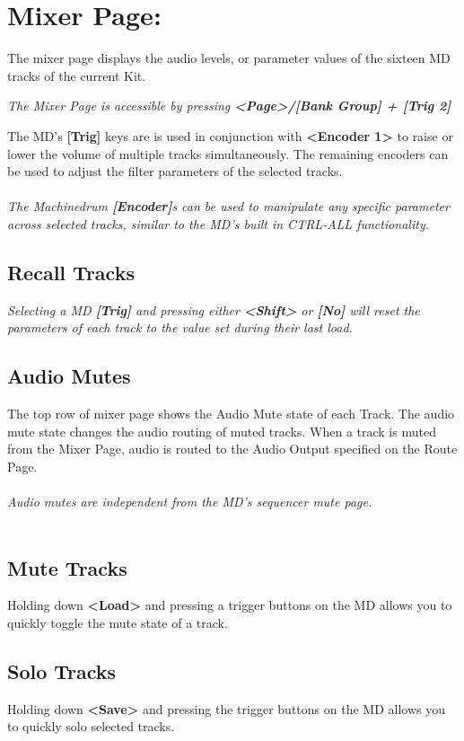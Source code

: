 \chapter{Mixer Page:}
The mixer page displays the audio levels, or parameter values of the sixteen MD tracks of the current Kit.

\textit{The Mixer Page is accessible by pressing \textbf{<Page>/[Bank Group] + [Trig 2]}}


The MD's \textbf{[Trig]} keys are is used in conjunction with \textbf{<Encoder 1>} to raise or lower the volume of multiple tracks simultaneously. The remaining encoders can be used to adjust the filter parameters of the selected tracks.\\\\
\textit{The Machinedrum \textbf{[Encoder]}s can be used to manipulate any specific parameter across selected tracks, similar to the MD's built in CTRL-ALL functionality.}
\section{Recall Tracks}
\textit{Selecting a MD \textbf{[Trig]} and pressing either \textbf{<Shift>} or \textbf{[No]} will reset the parameters of each track to the value set during their last load.}
\section{Audio Mutes}
The top row of mixer page shows the Audio Mute state of each Track. The audio mute state changes the audio routing of muted tracks. When a track is muted from the Mixer Page, audio is routed to the Audio Output specified on the Route Page.\\
\\
\textit{Audio mutes are independent from the MD's sequencer mute page.}
\\\\
\section{Mute Tracks}
Holding down \textbf{<Load>} and pressing a trigger buttons on the MD allows you to quickly toggle the mute state of a track.
\section{Solo Tracks}
Holding down \textbf{<Save>} and pressing the trigger buttons on the MD allows you to quickly solo selected tracks.\\\\

